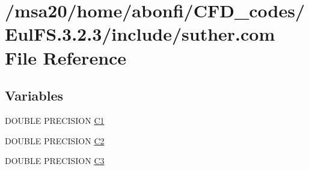 \hypertarget{msa20_2home_2abonfi_2_c_f_d__codes_2_eul_f_s_83_82_83_2include_2suther_8com}{\section{/msa20/home/abonfi/\-C\-F\-D\-\_\-codes/\-Eul\-F\-S.3.2.3/include/suther.com File Reference}
\label{msa20_2home_2abonfi_2_c_f_d__codes_2_eul_f_s_83_82_83_2include_2suther_8com}
}
\subsection*{Variables}
\begin{DoxyCompactItemize}
\item 
D\-O\-U\-B\-L\-E P\-R\-E\-C\-I\-S\-I\-O\-N \hyperlink{msa20_2home_2abonfi_2_c_f_d__codes_2_eul_f_s_83_82_83_2include_2suther_8com_ab5cd2bb7fe9bc6f4c3fbce5047b24fdd}{C1}
\item 
D\-O\-U\-B\-L\-E P\-R\-E\-C\-I\-S\-I\-O\-N \hyperlink{msa20_2home_2abonfi_2_c_f_d__codes_2_eul_f_s_83_82_83_2include_2suther_8com_a3331bf2c79fcd00308bcc7b0cef16dbc}{C2}
\item 
D\-O\-U\-B\-L\-E P\-R\-E\-C\-I\-S\-I\-O\-N \hyperlink{msa20_2home_2abonfi_2_c_f_d__codes_2_eul_f_s_83_82_83_2include_2suther_8com_aef24340798c9166836ba767a9170bf1a}{C3}
\end{DoxyCompactItemize}


